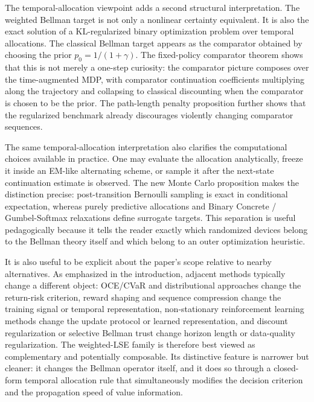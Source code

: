 \documentclass{article}
\theoremstyle{remark}
\begin{document}
The temporal-allocation viewpoint adds a second structural interpretation.
The weighted Bellman target is not only a nonlinear certainty equivalent.
It is also the exact solution of a KL-regularized binary optimization problem over temporal allocations.
The classical Bellman target appears as the comparator obtained by choosing the prior $p_0=1/(1+\gamma)$.
The fixed-policy comparator theorem shows that this is not merely a one-step curiosity: the comparator picture composes over the time-augmented MDP, with comparator continuation coefficients multiplying along the trajectory and collapsing to classical discounting when the comparator is chosen to be the prior.
The path-length penalty proposition further shows that the regularized benchmark already discourages violently changing comparator sequences.

The same temporal-allocation interpretation also clarifies the computational choices available in practice.
One may evaluate the allocation analytically, freeze it inside an EM-like alternating scheme, or sample it after the next-state continuation estimate is observed.
The new Monte Carlo proposition makes the distinction precise: post-transition Bernoulli sampling is exact in conditional expectation, whereas purely predictive allocations and Binary Concrete / Gumbel-Softmax relaxations define surrogate targets.
This separation is useful pedagogically because it tells the reader exactly which randomized devices belong to the Bellman theory itself and which belong to an outer optimization heuristic.

It is also useful to be explicit about the paper's scope relative to nearby alternatives. As emphasized in the introduction, adjacent methods typically change a different object: OCE/CVaR and distributional approaches change the return-risk criterion, reward shaping and sequence compression change the training signal or temporal representation, non-stationary reinforcement learning methods change the update protocol or learned representation, and discount regularization or selective Bellman trust change horizon length or data-quality regularization. The weighted-LSE family is therefore best viewed as complementary and potentially composable. Its distinctive feature is narrower but cleaner: it changes the Bellman operator itself, and it does so through a closed-form temporal allocation rule that simultaneously modifies the decision criterion and the propagation speed of value information.
\end{document}
